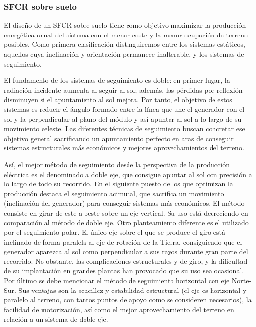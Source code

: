 \subsubsection{SFCR sobre suelo}

El diseño de un SFCR sobre suelo tiene como objetivo maximizar la
producción energética anual del sistema con el menor coste y la menor
ocupación de terreno posibles. Como primera clasificación distinguiremos
entre los sistemas estáticos, aquellos cuya inclinación y orientación
permanece inalterable, y los sistemas de seguimiento.

El fundamento de los sistemas de seguimiento es doble: en primer lugar,
la radiación incidente aumenta al seguir al sol; además, las pérdidas
por reflexión disminuyen si el apuntamiento al sol mejora. Por tanto,
el objetivo de estos sistemas es reducir el ángulo formado entre la
línea que une el generador con el sol y la perpendicular al plano
del módulo y así apuntar al sol a lo largo de su movimiento celeste.
Las diferentes técnicas de seguimiento buscan concretar ese objetivo
general sacrificando un apuntamiento perfecto en aras de conseguir
sistemas estructurales más económicos y mejores aprovechamientos del
terreno. 

Así, el mejor método de seguimiento desde la perspectiva de la producción
eléctrica es el denominado a doble eje, que consigue apuntar al sol
con precisión a lo largo de todo su recorrido. En el siguiente puesto
de los que optimizan la producción destaca el seguimiento acimutal,
que sacrifica un movimiento (inclinación del generador) para conseguir
sistemas más económicos. El método consiste en girar de este a oeste
sobre un eje vertical. Su uso está decreciendo en comparación al método
de doble eje. Otro planteamiento diferente es el utilizado por el
seguimiento polar. El único eje sobre el que se produce el giro está
inclinado de forma paralela al eje de rotación de la Tierra, consiguiendo
que el generador aparezca al sol como perpendicular a sus rayos durante
gran parte del recorrido. No obstante, las complicaciones estructurales
y de giro, y la dificultad de su implantación en grandes plantas han
provocado que su uso sea ocasional. Por último se debe mencionar el
método de seguimiento horizontal con eje Norte-Sur. Sus ventajas son
la sencillez y estabilidad estructural (el eje es horizontal y paralelo
al terreno, con tantos puntos de apoyo como se consideren necesarios),
la facilidad de motorización, así como el mejor aprovechamiento del
terreno en relación a un sistema de doble eje.

